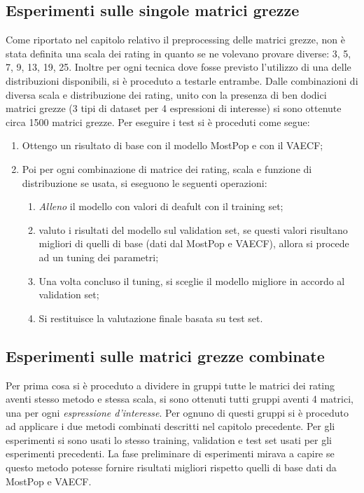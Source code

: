 \subsection{Esperimenti sulle singole matrici grezze}
Come riportato nel capitolo relativo il preprocessing delle matrici grezze, non è stata definita una scala dei rating in quanto se ne volevano provare diverse: 3, 5, 7, 9, 13, 19, 25.
Inoltre per ogni tecnica dove fosse previsto l'utilizzo di una delle distribuzioni disponibili, si è proceduto a testarle entrambe.
Dalle combinazioni di diversa scala e distribuzione dei rating, unito con la presenza di ben dodici matrici grezze (3 tipi di dataset per 4 espressioni di interesse) si sono ottenute circa 1500 matrici grezze.
Per eseguire i test si è proceduti come segue:
\begin{enumerate}
    \item Ottengo un risultato di base con il modello MostPop e con il VAECF;
    \item Poi per ogni combinazione di matrice dei rating, scala e funzione di distribuzione se usata, si eseguono le seguenti operazioni:
    \begin{enumerate}
        \item \textit{Alleno} il modello con valori di deafult con il training set;
        \item valuto i risultati del modello sul validation set, se questi valori risultano migliori di quelli di base (dati dal MostPop e VAECF), allora si procede ad un tuning dei parametri;
        \item Una volta concluso il tuning, si sceglie il modello migliore in accordo al validation set;
        \item Si restituisce la valutazione finale basata su test set.
    \end{enumerate}
\end{enumerate}

\subsection{Esperimenti sulle matrici grezze combinate}
Per prima cosa si è proceduto a dividere in gruppi tutte le matrici dei rating aventi stesso metodo e stessa scala, si sono ottenuti tutti gruppi aventi 4 matrici, una per ogni \textit{espressione d'interesse}. Per ognuno di questi gruppi si è proceduto ad applicare i due metodi combinati descritti nel capitolo precedente. Per gli esperimenti si sono usati lo stesso training, validation e test set usati per gli esperimenti precedenti. La fase preliminare di esperimenti mirava a capire se questo metodo potesse fornire risultati migliori rispetto quelli di base dati da MostPop e VAECF.

